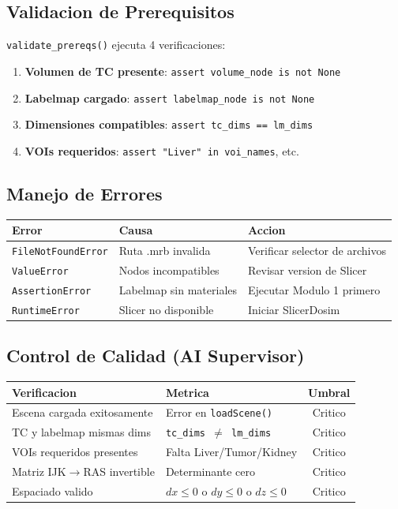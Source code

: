 \documentclass[12pt,a4paper]{article}
\begin{document}
\subsection{Validacion de Prerequisitos}

\texttt{validate\_prereqs()} ejecuta 4 verificaciones:

\begin{enumerate}
    \item \textbf{Volumen de TC presente}: \texttt{assert volume\_node is not None}
    \item \textbf{Labelmap cargado}: \texttt{assert labelmap\_node is not None}
    \item \textbf{Dimensiones compatibles}: \texttt{assert tc\_dims == lm\_dims}
    \item \textbf{VOIs requeridos}: \texttt{assert "Liver" in voi\_names}, etc.
\end{enumerate}

\subsection{Manejo de Errores}

\begin{center}
\begin{tabular}{lll}
\toprule
\textbf{Error} & \textbf{Causa} & \textbf{Accion} \\
\midrule
\texttt{FileNotFoundError} & Ruta .mrb invalida & Verificar selector de archivos \\
\texttt{ValueError} & Nodos incompatibles & Revisar version de Slicer \\
\texttt{AssertionError} & Labelmap sin materiales & Ejecutar Modulo 1 primero \\
\texttt{RuntimeError} & Slicer no disponible & Iniciar SlicerDosim \\
\bottomrule
\end{tabular}
\end{center}

\subsection{Control de Calidad (AI Supervisor)}

\begin{table}[H]
\centering
\begin{tabular}{llc}
\toprule
\textbf{Verificacion} & \textbf{Metrica} & \textbf{Umbral} \\
\midrule
Escena cargada exitosamente & Error en \texttt{loadScene()} & Critico \\
TC y labelmap mismas dims & \texttt{tc\_dims $\neq$ lm\_dims} & Critico \\
VOIs requeridos presentes & Falta Liver/Tumor/Kidney & Critico \\
Matriz IJK$\to$RAS invertible & Determinante cero & Critico \\
Espaciado valido & $dx \leq 0$ o $dy \leq 0$ o $dz \leq 0$ & Critico \\
\bottomrule
\end{tabular}
\end{table}
\end{document}
